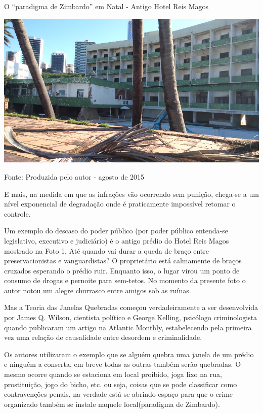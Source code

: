 \documentclass[
	12pt,				%
	openright,			%
	twoside,			%
	a4paper,			%
	chapter=TITLE,		%
	section=TITLE,		%
	subsection=TITLE,	%
	subsubsection=TITLE,%
	spanish,            %
	english,			%
	brazil				%
	]{abntex2}
\begin{document}
\begin{foto}[!htpb]
	\caption{\label{Foto0}O “paradigma de Zimbardo” em Natal - Antigo Hotel Reis Magos}
	\begin{center}
		\includegraphics[scale=0.45]{reis_magos2.png}
	\end{center}
	\ABNTEXchapterfont\small{Fonte: Produzida pelo autor - agosto de 2015}
\end{foto}
E mais, na medida em que as infrações vão ocorrendo sem punição, chega-se a um nível exponencial de degradação onde é praticamente impossível retomar o controle.
\par
Um exemplo do descaso do poder público (por poder público entenda-se legislativo, executivo e judiciário) é o antigo prédio do Hotel Reis Magos
mostrado na Foto 1. Até quando vai durar a queda de braço entre preservacionistas e vanguardistas? O proprietário está calmamente de braços cruzados esperando o prédio ruir. Enquanto isso, o lugar virou um ponto de consumo de drogas e pernoite para sem-tetos. No momento da presente foto o autor notou um alegre churrasco entre amigos sob as ruínas.
\par
Mas a Teoria das Janelas Quebradas começou verdadeiramente a ser desenvolvida por James Q. Wilson, cientista político e George Kelling, psicólogo criminologista quando publicaram um artigo na Atlantic Monthly, estabelecendo pela primeira vez uma relação de causalidade entre desordem e criminalidade.
\par
Os autores utilizaram o exemplo que se alguém quebra uma janela de um prédio e ninguém a conserta, em breve todas as outras também serão quebradas. O mesmo ocorre quando se estaciona em local proibido, joga lixo na rua, prostituição, jogo do bicho, etc. ou seja, coisas que se pode classificar como
contravenções penais, na verdade está se abrindo espaço para que o crime organizado também se instale naquele local(paradigma de Zimbardo).
\end{document}
